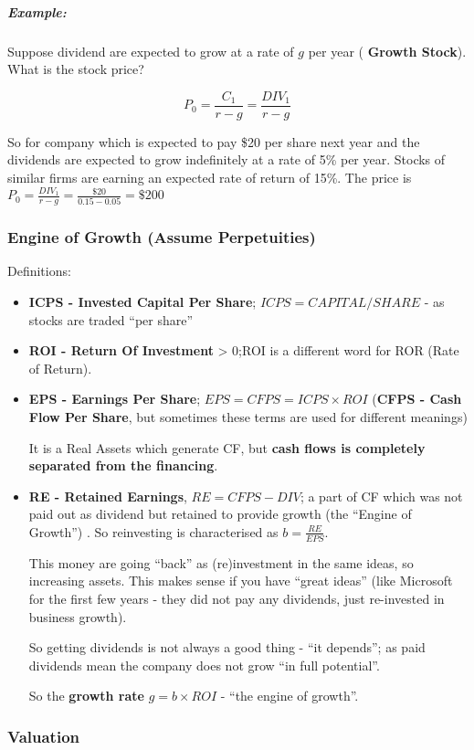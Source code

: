 \documentclass{scrartcl}
\newcommand{\example}{\subparagraph{Example:}} %
\begin{document}
\example Suppose dividend are expected to grow at a rate of $g$ per year ({\bf
  Growth Stock}). What is the stock price?

$$P_0 = \frac{C_1}{r-g} = \frac{DIV_1}{r-g}$$

So for company which is expected to pay \$20 per share next year and the
dividends are expected to grow indefinitely at a rate of 5\% per year. Stocks of
similar firms are earning an expected rate of return of 15\%. The price is
$P_0=\frac{DIV_1}{r-g} = \frac{\$20}{0.15-0.05} = \$200$

\subsubsection{Engine of Growth (Assume Perpetuities)}
\label{sec:EngineOfGrowth}

Definitions:
\begin{itemize}
\item {\bf ICPS - Invested Capital Per Share}; $ICPS = CAPITAL/SHARE$ - as
  stocks are traded ``per share''
\item {\bf ROI - Return Of Investment} > 0;ROI is a different word for ROR (Rate
  of Return).
\item {\bf EPS - Earnings Per Share}; $EPS = CFPS = ICPS \times ROI$ ({\bf CFPS
    - Cash Flow Per Share}, but sometimes these terms are used for different
  meanings)

  It is a Real Assets which generate CF, but {\bf cash flows is completely
    separated from the financing}.

\item {\bf RE - Retained Earnings}, $RE = CFPS - DIV$; a part of CF which was
  not paid out as dividend but retained to provide growth (the ``Engine of
  Growth'') . So reinvesting is characterised as $b=\frac{RE}{EPS}$.

  This money are going ``back'' as (re)investment in the same ideas, so
  increasing assets. This makes sense if you have ``great ideas'' (like
  Microsoft for the first few years - they did not pay any dividends, just
  re-invested in business growth).

  So getting dividends is not always a good thing - ``it depends''; as paid
  dividends mean the company does not grow ``in full potential''.

  So the {\bf growth rate} $g = b \times ROI$ - ``the engine of growth''.
\end{itemize}
\subsubsection{Valuation}
\label{sec:StockPricingValuation}
\end{document}
